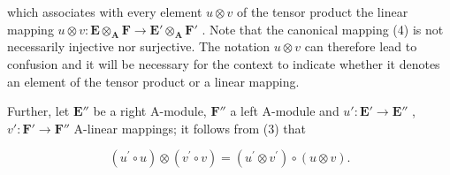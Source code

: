 which associates with every element \(u \otimes v\) of the tensor product the linear mapping \(u \otimes v: \mathbf{E} \otimes_{\mathbf{A}} \mathbf{F} \to \mathbf{E}' \otimes_{\mathbf{A}} \mathbf{F}'\) . Note that the canonical mapping (4) is not necessarily injective nor surjective. The notation \(u \otimes v\) can therefore lead to confusion and it will be necessary for the context to indicate whether it denotes an element of the tensor product or a linear mapping.

Further, let \(\mathbf{E}''\) be a right A-module, \(\mathbf{F}''\) a left A-module and \(u':\mathbf{E}'\to\mathbf{E}''\) , \(v':\mathbf{F}'\to\mathbf{F}''\) A-linear mappings; it follows from (3) that

\[
\left(u ^ {\prime} \circ u\right) \otimes \left(v ^ {\prime} \circ v\right) = \left(u ^ {\prime} \otimes v ^ {\prime}\right) \circ (u \otimes v).\tag{5}
\]
